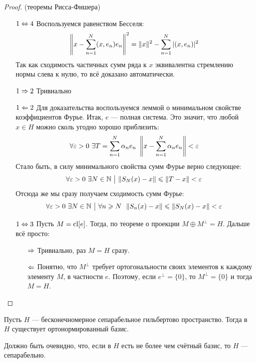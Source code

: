 \begin{proof} (теоремы Рисса-Фишера)
	\begin{itemize}
		\item[$1 \Leftrightarrow  4$] Воспользуемся равенством Бесселя:
		\[
			\left\|x - \sum_{n = 1}^N (x, e_n)e_n\right\|^2 = \|x\|^2 - \sum_{n = 1}^N |(x, e_n)|^2
		\]
		Так как сходимость частичных сумм ряда к $x$ эквивалентна стремлению нормы слева к нулю, то всё доказано автоматически.
		
		\item[$1 \Rightarrow 2$] Тривиально
		
		\item[$1 \Leftarrow 2$] Для доказательства воспользуемся леммой о минимальном свойстве коэффициентов Фурье. Итак, $e$ --- полная система. Это значит, что любой $x \in H$ можно сколь угодно хорошо приблизить:
		\[
			\forall \varepsilon > 0\ \exists T = \sum_{n = 1}^N \alpha_n e_n\ \left\|x - \sum_{n = 1}^N \alpha_n e_n\right\| < \varepsilon
		\]
		Стало быть, в силу минимального свойства сумм Фурье верно следующее:
		\[
			\forall \varepsilon > 0\ \exists N \in \mathbb{N} \ \big|\  \|S_N(x) - x\| \leqslant \|T - x\| < \varepsilon
		\]
		Отсюда же мы сразу получаем сходимость сумм Фурье:
		\[
			\forall \varepsilon > 0\ \exists N \in \mathbb{N} \ \big|\  \forall n \geqslant N\ \ \|S_n(x) - x\| \leqslant \|S_N(x) - x\| < \varepsilon
		\]
	
		\item[$1 \Leftrightarrow 3$] Пусть $M = \operatorname{cl} [e]$. Тогда, по теореме о проекции $M \oplus M^\bot = H$. Дальше всё просто:
		\begin{itemize}
			\item[$\Rightarrow$] Тривиально, раз $M = H$ сразу.
			
			\item[$\Leftarrow$] Понятно, что $M^\bot$ требует ортогональности своих элементов к каждому элементу $M$, в частности $e$. Поэтому, если $e^\bot = \{0\}$, то $M^\bot = \{0\}$ и тогда $M = H$.
		\end{itemize}
	\end{itemize}
\end{proof}

\begin{theorem}
	Пусть $H$ --- бесконечномерное сепарабельное гильбертово пространство. Тогда в $H$ существует ортонормированный базис.
\end{theorem}

\begin{note}
	Должно быть очевидно, что, если в $H$ есть не более чем счётный базис, то $H$ --- сепарабельно.
\end{note}

